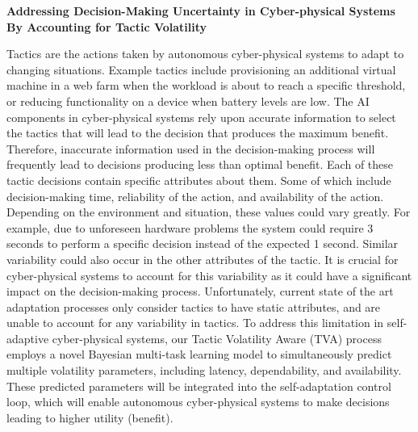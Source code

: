 \documentclass[11pt]{proposalnsf}
\newcommand{\Title}{Addressing Decision-Making Uncertainty in Cyber-physical Systems By Accounting for Tactic Volatility}
\newcommand{\dan}[1]{\textcolor{blue}{{\it [Dan says: #1]}}}
\begin{document}
{\small \bf \Title} %
\newline
\centerline{\titlerule}







Tactics are the actions taken by autonomous cyber-physical systems to adapt to changing situations. Example tactics include provisioning an additional virtual machine in a web farm when the workload is about to reach a specific threshold, or reducing functionality on a device when battery levels are low. The AI components in cyber-physical systems rely upon accurate information to select the tactics that will lead to the decision that produces the maximum benefit. Therefore, inaccurate information used in the decision-making process will frequently lead to decisions producing less than optimal benefit. Each of these tactic decisions contain specific attributes about them. Some of which include decision-making time, reliability of the action, and availability of the action. Depending on the environment and situation, these values could vary greatly. For example, due to unforeseen hardware problems the system could require 3 seconds to perform a specific decision instead of the expected 1 second. Similar variability could also occur in the other attributes of the tactic. It is crucial for cyber-physical systems to account for this variability as it could have a significant impact on the decision-making process. Unfortunately, current state of the art adaptation processes only consider tactics to have static attributes, and are unable to account for any variability in tactics. To address this limitation in self-adaptive cyber-physical systems, our Tactic Volatility Aware (TVA) process employs a novel Bayesian multi-task learning model to simultaneously predict multiple volatility parameters, including latency, dependability, and availability. These predicted parameters will be integrated into the self-adaptation control loop, which will enable autonomous cyber-physical systems to make decisions leading to higher utility (benefit).
\end{document}
